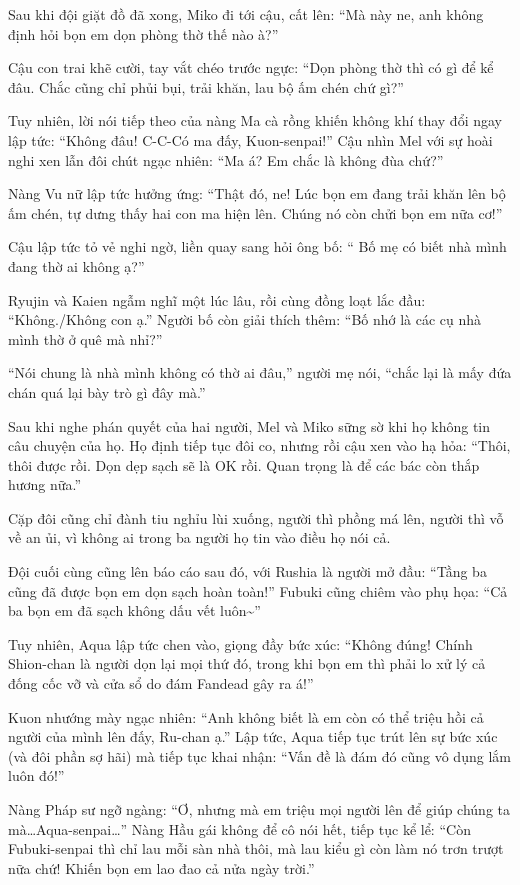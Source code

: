 \documentclass[../main.tex]{subfiles}
\begin{document}
Sau khi đội giặt đồ đã xong, Miko đi tới cậu, cất lên: ``Mà này ne, anh không định hỏi bọn em dọn phòng thờ thế nào à?''

Cậu con trai khẽ cười, tay vắt chéo trước ngực: ``Dọn phòng thờ thì có gì để kể đâu. Chắc cũng chỉ phủi bụi, trải khăn, lau bộ ấm chén chứ gì?''

Tuy nhiên, lời nói tiếp theo của nàng Ma cà rồng khiến không khí thay đổi ngay lập tức: ``Không đâu! C-C-Có ma đấy, Kuon-senpai!'' Cậu nhìn Mel với sự hoài nghi xen lẫn đôi chút ngạc nhiên: ``Ma á? Em chắc là không đùa chứ?''

Nàng Vu nữ lập tức hưởng ứng: ``Thật đó, ne! Lúc bọn em đang trải khăn lên bộ ấm chén, tự dưng thấy hai con ma hiện lên. Chúng nó còn chửi bọn em nữa cơ!''

Cậu lập tức tỏ vẻ nghi ngờ, liền quay sang hỏi ông bố: ``{\color{red} Bố mẹ có biết nhà mình đang thờ ai không ạ?}''

Ryujin và Kaien ngẫm nghĩ một lúc lâu, rồi cùng đồng loạt lắc đầu: ``Không./Không con ạ.'' Người bố còn giải thích thêm: ``Bố nhớ là các cụ nhà mình thờ ở quê mà nhỉ?''

``Nói chung là nhà mình không có thờ ai đâu,'' người mẹ nói, ``chắc lại là mấy đứa chán quá lại bày trò gì đây mà.''

Sau khi nghe phán quyết của hai người, Mel và Miko sững sờ khi họ không tin câu chuyện của họ. Họ định tiếp tục đôi co, nhưng rồi cậu xen vào hạ hỏa: ``Thôi, thôi được rồi. Dọn dẹp sạch sẽ là OK rồi. Quan trọng là để các bác còn thắp hương nữa.''

Cặp đôi cũng chỉ đành tiu nghỉu lùi xuống, người thì phồng má lên, người thì vỗ về an ủi, vì không ai trong ba người họ tin vào điều họ nói cả.

Đội cuối cùng cũng lên báo cáo sau đó, với Rushia là người mở đầu: ``Tầng ba cũng đã được bọn em dọn sạch hoàn toàn!'' Fubuki cũng chiêm vào phụ họa: ``Cả ba bọn em đã sạch không dấu vết luôn\~{}''

Tuy nhiên, Aqua lập tức chen vào, giọng đầy bức xúc: ``Không đúng! Chính Shion-chan là người dọn lại mọi thứ đó, trong khi bọn em thì phải lo xử lý cả đống cốc vỡ và cửa sổ do đám Fandead gây ra á!''

Kuon nhướng mày ngạc nhiên: ``Anh không biết là em còn có thể triệu hồi cả người của mình lên đấy, Ru-chan ạ.'' Lập tức, Aqua tiếp tục trút lên sự bức xúc (và đôi phần sợ hãi) mà tiếp tục khai nhận: ``Vấn đề là đám đó cũng vô dụng lắm luôn đó!''

Nàng Pháp sư ngỡ ngàng: ``Ơ, nhưng mà em triệu mọi người lên để giúp chúng ta mà\dots Aqua-senpai\dots'' Nàng Hầu gái không để cô nói hết, tiếp tục kể lể: ``Còn Fubuki-senpai thì chỉ lau mỗi sàn nhà thôi, mà lau kiểu gì còn làm nó trơn trượt nữa chứ! Khiến bọn em lao đao cả nửa ngày trời.''
\end{document}
